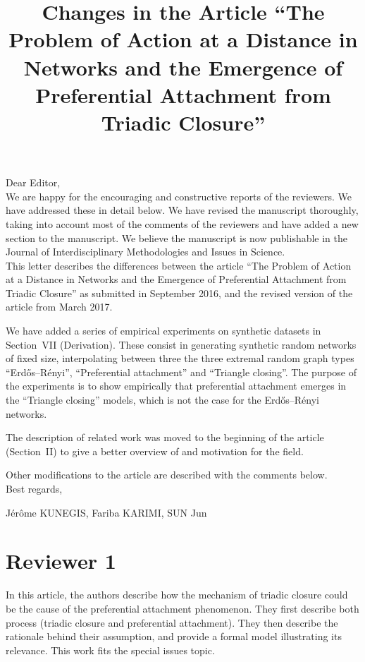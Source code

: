 \documentclass{article}
\title{Changes in the Article ``The Problem of Action at a Distance in Networks and the Emergence of Preferential Attachment from Triadic Closure''}
\begin{document}
\maketitle

Dear Editor, \\

We are happy for the encouraging and constructive reports of the
reviewers.  We have addressed these in detail below.  We have revised the
manuscript thoroughly, taking into account most of the comments of the
reviewers and have added a new section to the manuscript.  We believe the
manuscript is now publishable in the Journal of Interdisciplinary
Methodologies and Issues in Science.  \\

This letter describes the differences between the article ``The
Problem of Action at a Distance in Networks and the Emergence of
Preferential Attachment from Triadic Closure'' as submitted in September
2016, and the revised version of the article from March 2017.

We have added a series of empirical experiments on synthetic datasets in
Section~VII (Derivation).  These consist in generating synthetic random
networks of fixed size, interpolating between three the three extremal
random graph types ``Erdős--Rényi'', ``Preferential attachment'' and
``Triangle closing''.  The purpose of the experiments is to show
empirically that preferential attachment emerges in the ``Triangle
closing'' models, which is not the case for the Erdős--Rényi networks. 

The description of related work was moved to the beginning of the
article (Section~II) to give a better overview of and motivation for the
field. 

Other modifications to the article are described with the comments
below. \\

Best regards, 
\begin{flushright}
Jérôme KUNEGIS, Fariba KARIMI, SUN Jun
\end{flushright}

\section*{Reviewer 1}
In this article, the authors describe how the mechanism of triadic closure could be the cause of the preferential attachment phenomenon. They first describe both process (triadic closure and preferential attachment). They then describe the rationale behind their assumption, and provide a formal model illustrating its relevance. This work fits the special issues topic.
\end{document}
